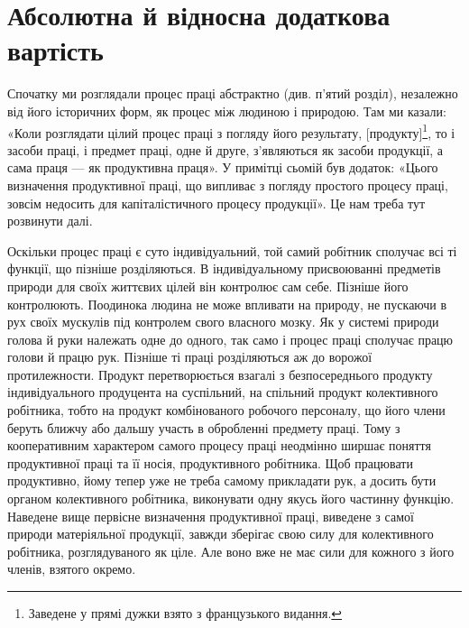 
\section{Абсолютна й відносна додаткова вартість}

Спочатку ми розглядали процес праці абстрактно (див. п’ятий
розділ), незалежно від його історичних форм, як процес між
людиною і природою. Там ми казали: «Коли розглядати цілий
процес праці з погляду його результату, [продукту]\footnote*{
Заведене у прямі дужки взято з французького видання. 
}, то і засоби
праці, і предмет праці, одне й друге, з’являються як засоби
продукції, а сама праця — як продуктивна праця». У примітці
сьомій був додаток: «Цього визначення продуктивної праці,
що випливає з погляду простого процесу праці, зовсім недосить
для капіталістичного процесу продукції». Це нам треба тут
розвинути далі.

Оскільки процес праці є суто індивідуальний, той самий
робітник сполучає всі ті функції, що пізніше розділяються. В індивідуальному
присвоюванні предметів природи для своїх життєвих
цілей він контролює сам себе. Пізніше його контролюють.
Поодинока людина не може впливати на природу, не пускаючи
в рух своїх мускулів під контролем свого власного мозку. Як у
системі природи голова й руки належать одне до одного, так само
і процес праці сполучає працю голови й працю рук. Пізніше ті
праці розділяються аж до ворожої протилежности. Продукт перетворюється
взагалі з безпосереднього продукту індивідуального
продуцента на суспільний, на спільний продукт колективного
робітника, тобто на продукт комбінованого робочого персоналу,
що його члени беруть ближчу або дальшу участь в обробленні
предмету праці. Тому з кооперативним характером самого процесу
праці неодмінно ширшає поняття продуктивної праці та
її носія, продуктивного робітника. Щоб працювати продуктивно,
йому тепер уже не треба самому прикладати рук, а досить бути
органом колективного робітника, виконувати одну якусь його
частинну функцію. Наведене вище первісне визначення продуктивної
праці, виведене з самої природи матеріяльної продукції,
завжди зберігає свою силу для колективного робітника, розглядуваного
як ціле. Але воно вже не має сили для кожного з його
членів, взятого окремо.

